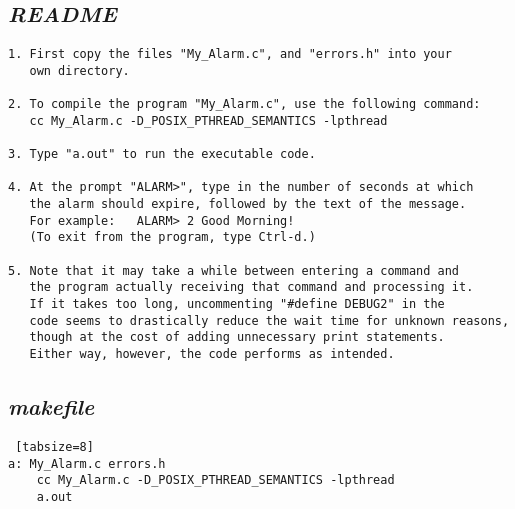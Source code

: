 \documentclass[11pt]{article}
\begin{document}
	\subsection{\emph{README}}
\begin{Verbatim}[tabsize=8]
1. First copy the files "My_Alarm.c", and "errors.h" into your
   own directory.

2. To compile the program "My_Alarm.c", use the following command:      
   cc My_Alarm.c -D_POSIX_PTHREAD_SEMANTICS -lpthread

3. Type "a.out" to run the executable code.

4. At the prompt "ALARM>", type in the number of seconds at which
   the alarm should expire, followed by the text of the message.
   For example:   ALARM> 2 Good Morning!  
   (To exit from the program, type Ctrl-d.)

5. Note that it may take a while between entering a command and
   the program actually receiving that command and processing it.
   If it takes too long, uncommenting "#define DEBUG2" in the
   code seems to drastically reduce the wait time for unknown reasons,
   though at the cost of adding unnecessary print statements.
   Either way, however, the code performs as intended.
\end{Verbatim}
	\subsection{\emph{makefile}}
	\lstset{language=C}        
\begin{Verbatim} [tabsize=8]
a: My_Alarm.c errors.h
	cc My_Alarm.c -D_POSIX_PTHREAD_SEMANTICS -lpthread
	a.out
	\end{Verbatim}
\end{document}
